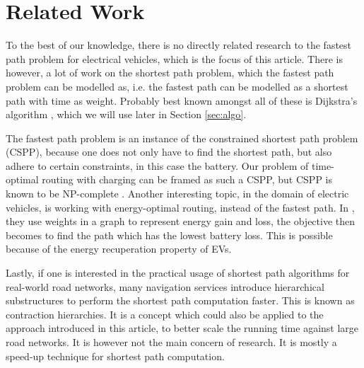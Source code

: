 \section{Related Work}\label{sec:relatedwork}
To the best of our knowledge, there is no directly related research to the fastest path problem for electrical vehicles, which is the focus of this article. There is however, a lot of work on the shortest path problem, which the fastest path problem can be modelled as, i.e. the fastest path can be modelled as a shortest path with time as weight. Probably best known amongst all of these is Dijkstra's algorithm \cite{dijkstra1959note}, which we will use later in Section \ref{sec:algo}. 

The fastest path problem is an instance of the constrained shortest path problem (CSPP)\cite{joksch1966shortest}, because one does not only have to find the shortest path, but also adhere to certain constraints, in this case the battery. Our problem of time-optimal routing with charging can be framed as such a CSPP, but CSPP is known to be NP-complete \cite{Garey:1979:CIG:578533}. Another interesting topic, in the domain of electric vehicles, is working with energy-optimal routing, instead of the fastest path. In  \cite{artmeier2010shortest}, they use weights in a graph to represent energy gain and loss, the objective then becomes to find the path which has the lowest battery loss. This is possible because of the energy recuperation property of EVs.



Lastly, if one is interested in the practical usage of shortest path algorithms for real-world road networks, many navigation services introduce hierarchical substructures to perform the shortest path computation faster. This is known as contraction hierarchies. It is a concept which could also be applied to the approach introduced in this article, to better scale the running time against large road networks. It is however not the main concern of research. It is mostly a speed-up technique for shortest path computation.